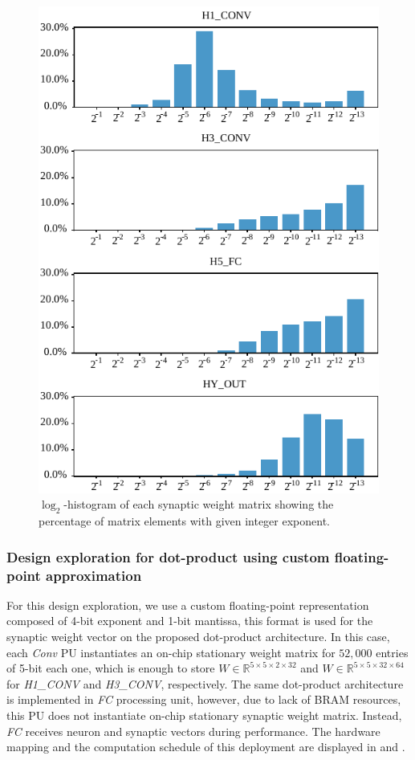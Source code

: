 \begin{figure}[h!]
	\includegraphics[width=\columnwidth]{../figures/log2_histogram.pdf}
	\caption{$\log_2$-histogram of each synaptic weight matrix showing the percentage of matrix elements with given integer exponent.}\label{fig:log2histogram}
\end{figure}

\subsubsection{Design exploration for dot-product using custom floating-point approximation}
For this design exploration, we use a custom floating-point representation composed of 4-bit exponent and 1-bit mantissa, this format is used for the synaptic weight vector on the proposed dot-product architecture. In this case, each \emph{Conv} PU instantiates an on-chip stationary weight matrix for $52,000$ entries of 5-bit each one, which is enough to store $W\in\mathbb{R}^{5\times 5\times 2\times 32}$ and $W\in\mathbb{R}^{5\times 5\times 32\times 64}$ for \emph{H1\_CONV} and \emph{H3\_CONV}, respectively. The same dot-product architecture is implemented in \emph{FC} processing unit, however, due to lack of BRAM resources, this PU does not instantiate on-chip stationary synaptic weight matrix. Instead, \emph{FC} receives neuron and synaptic vectors during performance. The hardware mapping and the computation schedule of this deployment are displayed in  and .

